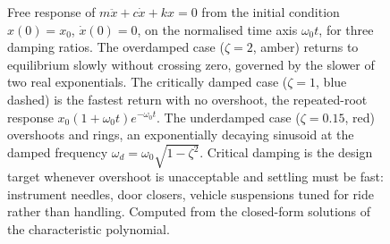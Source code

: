 \begin{figure}[htbp]
\centering
{}
\caption[The three damping regimes of the second-order
oscillator]{Free response of $m\ddot{x}+c\dot{x}+kx=0$ from the
initial condition $x(0)=x_{0}$, $\dot{x}(0)=0$, on the normalised
time axis $\omega_{0}t$, for three damping ratios. The overdamped
case ($\zeta=2$, amber) returns to equilibrium slowly without
crossing zero, governed by the slower of two real exponentials. The
critically damped case ($\zeta=1$, blue dashed) is the fastest
return with no overshoot, the repeated-root response
$x_{0}(1+\omega_{0}t)e^{-\omega_{0}t}$. The underdamped case
($\zeta=0.15$, red) overshoots and rings, an exponentially decaying
sinusoid at the damped frequency $\omega_{d}=\omega_{0}\sqrt{1-\zeta^{2}}$.
Critical damping is the design target whenever overshoot is
unacceptable and settling must be fast: instrument needles,
door closers, vehicle suspensions tuned for ride rather than
handling. Computed from the closed-form solutions of the
characteristic polynomial.}
\label{fig:vol02:ch07:damping-regimes}
\end{figure}
